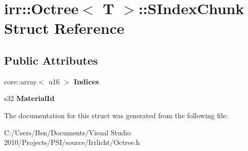 \hypertarget{structirr_1_1_octree_1_1_s_index_chunk}{\section{irr\-:\-:Octree$<$ T $>$\-:\-:S\-Index\-Chunk Struct Reference}
\label{structirr_1_1_octree_1_1_s_index_chunk}
}
\subsection*{Public Attributes}
\begin{DoxyCompactItemize}
\item 
\hypertarget{structirr_1_1_octree_1_1_s_index_chunk_afd28ce8f55dd3e17047ef99d54c5edcb}{core\-::array$<$ u16 $>$ {\bfseries Indices}}\label{structirr_1_1_octree_1_1_s_index_chunk_afd28ce8f55dd3e17047ef99d54c5edcb}

\item 
\hypertarget{structirr_1_1_octree_1_1_s_index_chunk_aeae61134a1413f75b7b605180d1e3a1f}{s32 {\bfseries Material\-Id}}\label{structirr_1_1_octree_1_1_s_index_chunk_aeae61134a1413f75b7b605180d1e3a1f}

\end{DoxyCompactItemize}


The documentation for this struct was generated from the following file\-:\begin{DoxyCompactItemize}
\item 
C\-:/\-Users/\-Ben/\-Documents/\-Visual Studio 2010/\-Projects/\-P\-S\-I/source/\-Irrlicht/Octree.\-h\end{DoxyCompactItemize}
